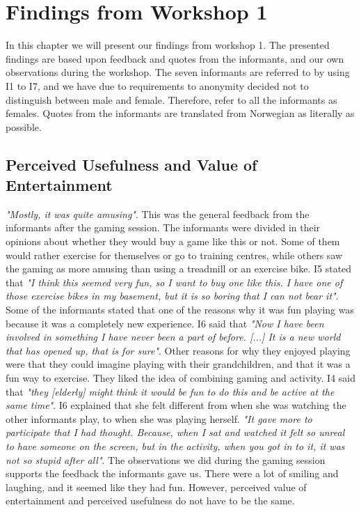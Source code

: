 \chapter{Findings from Workshop 1}
In this chapter we will present our findings from workshop 1. The presented findings are based upon feedback and quotes from the informants, and our own observations during the workshop. The seven informants are referred to by using I1 to I7, and we have due to requirements to anonymity decided not to distinguish between male and female. Therefore, refer to all the informants as females. Quotes from the informants are translated from Norwegian as literally as possible. 

\section{Perceived Usefulness and Value of Entertainment}
\emph{"Mostly, it was quite amusing"}. This was the general feedback from the informants after the gaming session. The informants were divided in their opinions about whether they would buy a game like this or not. Some of them would rather exercise for themselves or go to training centres, while others saw the gaming as more amusing than using a treadmill or an exercise bike. I5 stated that \emph{"I think this seemed very fun, so I want to buy one like this. I have one of those exercise bikes in my basement, but it is so boring that I can not bear it"}.  Some of the informants stated that one of the reasons why it was fun playing was because it was a completely new experience. I6 said that \emph{"Now I have been involved in something I have never been a part of before. [...] It is a new world that has opened up, that is for sure"}. Other reasons for why they enjoyed playing were that they could imagine playing with their grandchildren, and that it was a fun way to exercise. They liked the idea of combining gaming and activity. I4 said that \emph{"they [elderly] might think it would be fun to do this and be active at the same time"}. I6 explained that she felt different from when she was watching the other informants play, to when she was playing herself. \emph{"It gave more to participate that I had thought. Because, when I sat and watched it felt so unreal to have someone on the screen, but in the activity, when you got in to it, it was not so stupid after all"}. The observations we did during the gaming session supports the feedback the informants gave us. There were a lot of smiling and laughing, and it seemed like they had fun. However, perceived value of entertainment and perceived usefulness do not have to be the same. 


